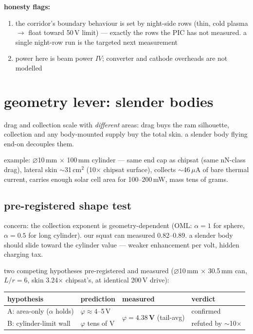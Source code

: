 \documentclass[11pt]{article}
\begin{document}
\textbf{honesty flags:}
\begin{enumerate}
  \item the corridor's boundary behaviour is set by night-side rows (thin, cold
        plasma $\to$ float toward 50\,V limit) --- exactly the rows the PIC has
        not measured.  a single night-row run is the targeted next measurement
  \item power here is beam power $IV$; converter and cathode overheads are not
        modelled
\end{enumerate}

\section{geometry lever: slender bodies}

drag and collection scale with \emph{different} areas: drag buys the ram
silhouette, collection and any body-mounted supply buy the total skin.  a slender body
flying end-on decouples them.

example: $\varnothing$10\,mm $\times$ 100\,mm cylinder --- same end cap as
chipsat (same nN-class drag), lateral skin $\sim$31\,cm$^2$ (10$\times$
chipsat surface), collects $\sim$46\,$\mu$A of bare thermal current, carries
enough solar cell area for 100--200\,mW, mass tens of grams.

\subsection{pre-registered shape test}

concern: the collection exponent is geometry-dependent (OML: $\alpha = 1$ for
sphere, $\alpha = 0.5$ for long cylinder).  our squat can measured 0.82--0.89.
a slender body should slide toward the cylinder value --- weaker enhancement
per volt, hidden charging tax.

two competing hypotheses pre-registered and measured ($\varnothing$10\,mm
$\times$ 30.5\,mm can, $L/r = 6$, skin 3.24$\times$ chipsat's, at identical
200\,V drive):

\begin{center}\small
\begin{tabular}{llll}
\toprule
hypothesis & prediction & measured & verdict \\
\midrule
A: area-only ($\alpha$ holds) & $\varphi \approx 4$--5\,V &
  \multirow{2}{*}{\textbf{$\varphi = 4.38$\,V} (tail-avg)} &
  \textcolor{gpass}{confirmed} \\
B: cylinder-limit wall & $\varphi$ tens of V & &
  \textcolor{gfail}{refuted by $\sim$10$\times$} \\
\bottomrule
\end{tabular}
\end{center}
\end{document}

